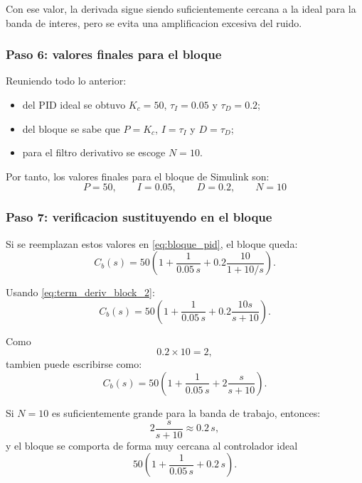 \documentclass[11pt]{article}
\begin{document}
Con ese valor, la derivada sigue siendo suficientemente cercana a la ideal para la banda de interes, pero se evita una amplificacion excesiva del ruido.

\subsubsection{Paso 6: valores finales para el bloque}

Reuniendo todo lo anterior:

\begin{itemize}[leftmargin=1.2cm]
\item del PID ideal se obtuvo $K_c=50$, $\tau_I=0.05$ y $\tau_D=0.2$;
\item del bloque se sabe que $P=K_c$, $I=\tau_I$ y $D=\tau_D$;
\item para el filtro derivativo se escoge $N=10$.
\end{itemize}

Por tanto, los valores finales para el bloque de Simulink son:
\begin{equation}
\boxed{
P=50,\qquad I=0.05,\qquad D=0.2,\qquad N=10
}
\label{eq:valores_bloque}
\end{equation}

\subsubsection{Paso 7: verificacion sustituyendo en el bloque}

Si se reemplazan estos valores en \eqref{eq:bloque_pid}, el bloque queda:
\begin{equation}
C_b(s)=50\left(1+\frac{1}{0.05\,s}+0.2\frac{10}{1+10/s}\right).
\end{equation}

Usando \eqref{eq:term_deriv_block_2}:
\begin{equation}
C_b(s)=50\left(1+\frac{1}{0.05\,s}+0.2\frac{10s}{s+10}\right).
\end{equation}

Como
\[
0.2\times 10 = 2,
\]
tambien puede escribirse como:
\begin{equation}
C_b(s)=50\left(1+\frac{1}{0.05\,s}+2\frac{s}{s+10}\right).
\label{eq:block_final_expanded}
\end{equation}

Si $N=10$ es suficientemente grande para la banda de trabajo, entonces:
\[
2\frac{s}{s+10}\approx 0.2\,s,
\]
y el bloque se comporta de forma muy cercana al controlador ideal
\[
50\left(1+\frac{1}{0.05\,s}+0.2\,s\right).
\]
\end{document}
